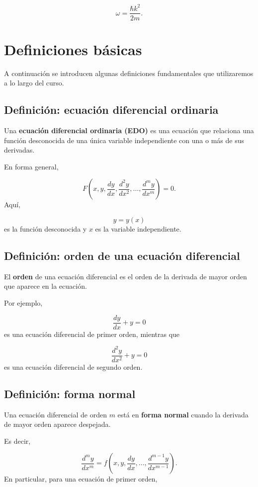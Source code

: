 \documentclass[12pt,a4paper]{article}
\begin{document}
	\[
	\omega=\frac{\hbar k^2}{2m}.
	\]
	\clearpage
	\section{Definiciones básicas}
	
	A continuación se introducen algunas definiciones fundamentales que utilizaremos a lo largo del curso.
	
	\subsection{Definición: ecuación diferencial ordinaria}
	
	Una \textbf{ecuación diferencial ordinaria (EDO)} es una ecuación que relaciona una función desconocida de una única variable independiente con una o más de sus derivadas.
	
	En forma general,
	
	\[
	F\left(
	x,
	y,
	\frac{dy}{dx},
	\frac{d^2y}{dx^2},
	\dots,
	\frac{d^m y}{dx^m}
	\right)
	=
	0.
	\]
	Aquí,
	
	\[
	y=y(x)
	\]
	es la función desconocida y \(x\) es la variable independiente.
	
	\subsection{Definición: orden de una ecuación diferencial}
	
	El \textbf{orden} de una ecuación diferencial es el orden de la derivada de mayor orden que aparece en la ecuación.
	
	Por ejemplo,
	
	\[
	\frac{dy}{dx}+y=0
	\]
	es una ecuación diferencial de primer orden, mientras que
	
	\[
	\frac{d^2y}{dx^2}+y=0
	\]
	es una ecuación diferencial de segundo orden.
	
	\subsection{Definición: forma normal}
	
	Una ecuación diferencial de orden \(m\) está en \textbf{forma normal} cuando la derivada de mayor orden aparece despejada.
	
	Es decir,
	
	\[
	\frac{d^m y}{dx^m}
	=
	f\left(
	x,
	y,
	\frac{dy}{dx},
	\dots,
	\frac{d^{m-1}y}{dx^{m-1}}
	\right).
	\]
	En particular, para una ecuación de primer orden,
	
\end{document}

